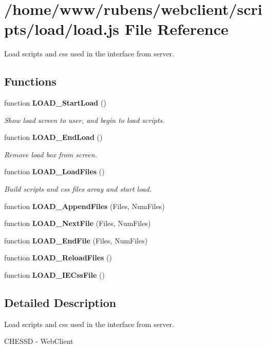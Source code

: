 \section{/home/www/rubens/webclient/scripts/load/load.js File Reference}
\label{load_2load_8js}
Load scripts and css used in the interface from server. 

\subsection*{Functions}
\begin{CompactItemize}
\item 
function {\bf LOAD\_\-StartLoad} ()
\begin{CompactList}\small\item\em Show load screen to user, and begin to load scripts. \item\end{CompactList}\item 
function {\bf LOAD\_\-EndLoad} ()
\begin{CompactList}\small\item\em Remove load box from screen. \item\end{CompactList}\item 
function {\bf LOAD\_\-LoadFiles} ()
\begin{CompactList}\small\item\em Build scripts and css files array and start load. \item\end{CompactList}\item 
function {\bf LOAD\_\-AppendFiles} (Files, NumFiles)
\item 
function {\bf LOAD\_\-NextFile} (Files, NumFiles)
\item 
function {\bf LOAD\_\-EndFile} (Files, NumFiles)
\item 
function {\bf LOAD\_\-ReloadFiles} ()
\item 
function {\bf LOAD\_\-IECssFile} ()
\end{CompactItemize}


\subsection{Detailed Description}
Load scripts and css used in the interface from server. 

CHESSD - WebClient

